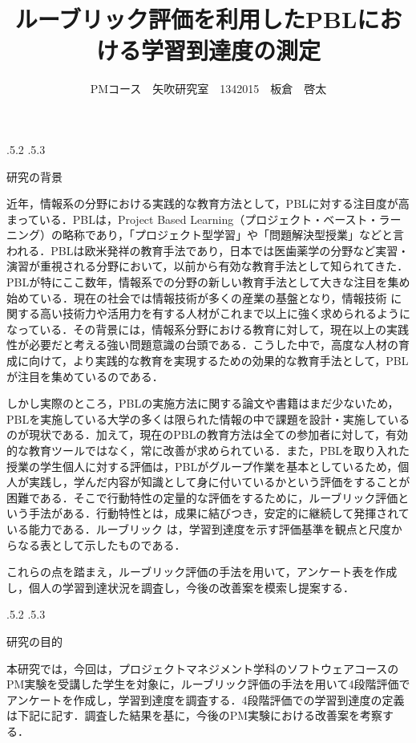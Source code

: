 \documentclass[uplatex]{jsarticle}
\title{\vspace{-14mm}ルーブリック評価を利用したPBLにおける学習到達度の測定}
\author{PMコース　矢吹研究室　1342015　板倉　啓太}
\date{}%
\makeatletter
\renewcommand{\section}{%
    \if@slide\clearpage\fi
    \@startsection{section}{1}{\z@}%
    {\Cvs \@plus.5\Cdp \@minus.2\Cdp}%
    {.5\Cvs \@plus.3\Cdp}%
    {\normalfont\raggedright}}
\makeatother
\begin{document}
\maketitle





\section{研究の背景}

近年，情報系の分野における実践的な教育方法として，PBLに対する注目度が高まっている\cite{PBL}\cite{PBL1}．PBLは，Project Based Learning（プロジェクト・ベースト・ラーニング）の略称であり，「プロジェクト型学習」や「問題解決型授業」などと言われる．PBLは欧米発祥の教育手法であり，日本では医歯薬学の分野など実習・演習が重視される分野において，以前から有効な教育手法として知られてきた．PBLが特にここ数年，情報系での分野の新しい教育手法として大きな注目を集め始めている．現在の社会では情報技術が多くの産業の基盤となり，情報技術 に関する高い技術力や活用力を有する人材がこれまで以上に強く求められるようになっている．その背景には，情報系分野における教育に対して，現在以上の実践性が必要だと考える強い問題意識の台頭である．こうした中で，高度な人材の育成に向けて，より実践的な教育を実現するための効果的な教育手法として，PBLが注目を集めているのである．

しかし実際のところ，PBLの実施方法に関する論文や書籍はまだ少ないため，PBLを実施している大学の多くは限られた情報の中で課題を設計・実施しているのが現状である．加えて，現在のPBLの教育方法は全ての参加者に対して，有効的な教育ツールではなく，常に改善が求められている．また，PBLを取り入れた授業の学生個人に対する評価は，PBLがグループ作業を基本としているため，個人が実践し，学んだ内容が知識として身に付いているかという評価をすることが困難である．そこで行動特性の定量的な評価をするために，ルーブリック評価という手法がある\cite{ルーブリック評価}．行動特性とは，成果に結びつき，安定的に継続して発揮されている能力である．ルーブリック は，学習到達度を示す評価基準を観点と尺度からなる表として示したものである．

これらの点を踏まえ，ルーブリック評価の手法を用いて，アンケート表を作成し，個人の学習到達状況を調査し，今後の改善案を模索し提案する．




\section{研究の目的}

本研究では，今回は，プロジェクトマネジメント学科のソフトウェアコースのPM実験を受講した学生を対象に，ルーブリック評価の手法を用いて4段階評価でアンケートを作成し，学習到達度を調査する．4段階評価での学習到達度の定義は下記に記す．調査した結果を基に，今後のPM実験における改善案を考察する．
\end{document}
